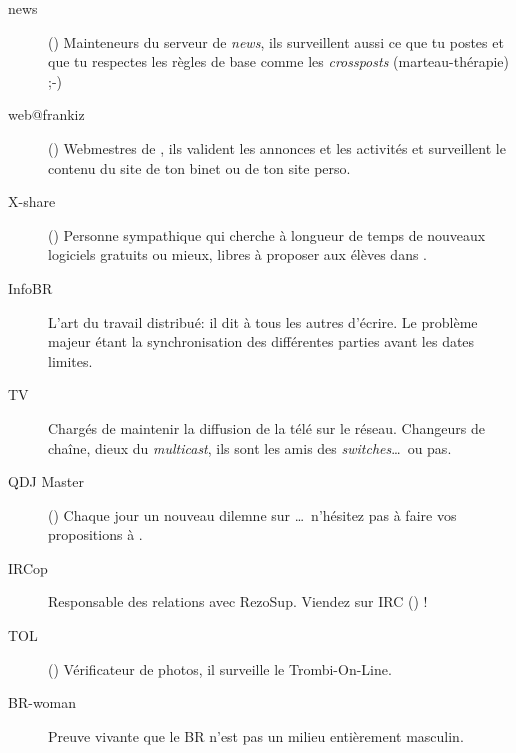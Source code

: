 \begin{description}
  \item[news] {() Mainteneurs du serveur de \emph{news}, ils surveillent aussi ce que tu postes et que tu respectes les r\`egles de base comme les \emph{crossposts} (marteau-th\'erapie) \mbox{;-)}}

  \item[web@frankiz] {() Webmestres de \fkz, ils valident les annonces et les activit\'es et surveillent le contenu du site de ton binet ou de ton site perso.}

  \item[X-share] {() Personne sympathique qui cherche \`a longueur de temps de nouveaux logiciels gratuits ou mieux, libres \`a proposer aux \'el\`eves dans \xshare.}

  \item[InfoBR]{L'art du travail distribu\'e: il dit \`a tous les autres d'\'ecrire. Le probl\`eme majeur \'etant la synchronisation des diff\'erentes parties avant les dates limites.}

  \item[TV]{Charg\'es de maintenir la diffusion de la t\'el\'e sur le r\'eseau. Changeurs de cha\^ine, dieux du \emph{multicast}, ils sont les amis des \emph{switches}\dots\ ou pas.}

  \item[QDJ Master] {() Chaque jour un nouveau dilemne sur \fkz\dots\ n'h\'esitez pas \`a faire vos propositions \`a .}

  \item[IRCop]{Responsable des relations avec RezoSup. Viendez sur IRC () !}

  \item[TOL] {() V\'erificateur de photos, il surveille le Trombi-On-Line.}

  \item[BR-woman]{Preuve vivante que le BR n'est pas un milieu enti\`erement masculin.}

\end{description}
